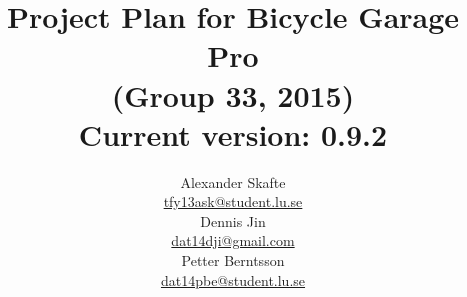 \title{
	Project Plan for Bicycle Garage Pro\\
	(Group 33, 2015)\\
	\vspace{0.2in}
	\normalsize Current version: 0.9.2
}
\author{
	Alexander Skafte\\
	\url{tfy13ask@student.lu.se}\\
	Dennis Jin\\
	\url{dat14dji@gmail.com}\\
	Petter Berntsson\\
	\url{dat14pbe@student.lu.se}
}
\date{}
